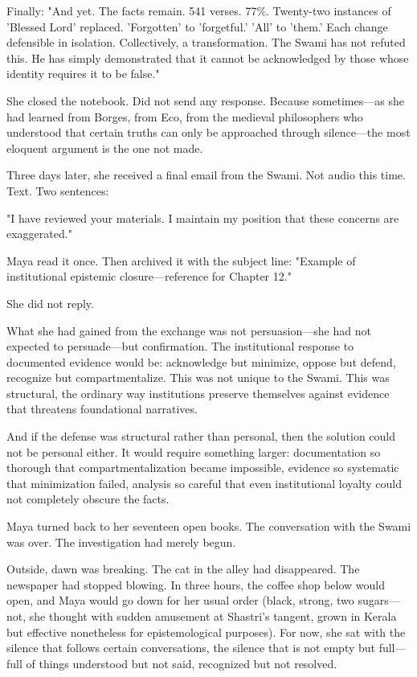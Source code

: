 \documentclass[12pt,twoside]{book}
\begin{document}
Finally: "And yet. The facts remain. 541 verses. 77\%. Twenty-two instances of 'Blessed Lord' replaced. 'Forgotten' to 'forgetful.' 'All' to 'them.' Each change defensible in isolation. Collectively, a transformation. The Swami has not refuted this. He has simply demonstrated that it cannot be acknowledged by those whose identity requires it to be false."

She closed the notebook. Did not send any response. Because sometimes—as she had learned from Borges, from Eco, from the medieval philosophers who understood that certain truths can only be approached through silence—the most eloquent argument is the one not made.

Three days later, she received a final email from the Swami. Not audio this time. Text. Two sentences:

"I have reviewed your materials. I maintain my position that these concerns are exaggerated."

Maya read it once. Then archived it with the subject line: "Example of institutional epistemic closure—reference for Chapter 12."

She did not reply.

What she had gained from the exchange was not persuasion—she had not expected to persuade—but confirmation. The institutional response to documented evidence would be: acknowledge but minimize, oppose but defend, recognize but compartmentalize. This was not unique to the Swami. This was structural, the ordinary way institutions preserve themselves against evidence that threatens foundational narratives.

And if the defense was structural rather than personal, then the solution could not be personal either. It would require something larger: documentation so thorough that compartmentalization became impossible, evidence so systematic that minimization failed, analysis so careful that even institutional loyalty could not completely obscure the facts.

Maya turned back to her seventeen open books. The conversation with the Swami was over. The investigation had merely begun.

Outside, dawn was breaking. The cat in the alley had disappeared. The newspaper had stopped blowing. In three hours, the coffee shop below would open, and Maya would go down for her usual order (black, strong, two sugars—not, she thought with sudden amusement at Shastri's tangent, grown in Kerala but effective nonetheless for epistemological purposes). For now, she sat with the silence that follows certain conversations, the silence that is not empty but full—full of things understood but not said, recognized but not resolved.
\end{document}
